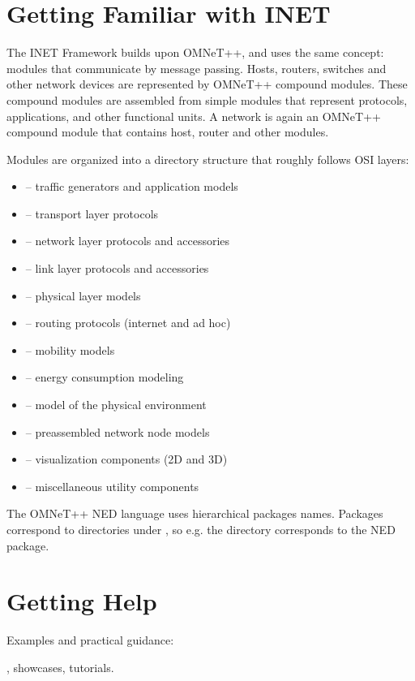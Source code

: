 \section{Getting Familiar with INET}

The INET Framework builds upon OMNeT++, and uses the same concept: modules
that communicate by message passing. Hosts, routers, switches and other
network devices are represented by OMNeT++ compound modules. These compound
modules are assembled from simple modules that represent protocols,
applications, and other functional units. A network is again an OMNeT++
compound module that contains host, router and other modules.

Modules are organized into a directory structure that roughly follows 
OSI layers:

\begin{itemize}
  \item {} -- traffic generators and application models
  \item {} -- transport layer protocols
  \item {} -- network layer protocols and accessories
  \item {} -- link layer protocols and accessories
  \item {} -- physical layer models
  \item {} -- routing protocols (internet and ad hoc)
  \item {} -- mobility models
  \item {} -- energy consumption modeling
  \item {} -- model of the physical environment
  \item {} -- preassembled network node models
  \item {} -- visualization components (2D and 3D)
  \item {} -- miscellaneous utility components
\end{itemize}

The OMNeT++ NED language uses hierarchical packages names. Packages correspond 
to directories under , so e.g. the 
directory corresponds to the  NED package.

\section{Getting Help}

Examples and practical guidance:

 , 
 showcases, 
 tutorials.





